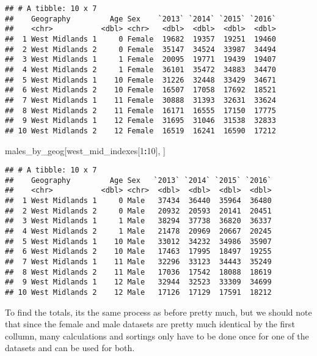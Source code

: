 \documentclass[]{article}
\newenvironment{Shaded}{\begin{snugshade}}{\end{snugshade}}
\newcommand{\DecValTok}[1]{\textcolor[rgb]{0.00,0.00,0.81}{#1}}
\newcommand{\OperatorTok}[1]{\textcolor[rgb]{0.81,0.36,0.00}{\textbf{#1}}}
\newcommand{\NormalTok}[1]{#1}
\begin{document}
\begin{verbatim}
## # A tibble: 10 x 7
##    Geography         Age Sex    `2013` `2014` `2015` `2016`
##    <chr>           <dbl> <chr>   <dbl>  <dbl>  <dbl>  <dbl>
##  1 West Midlands 1     0 Female  19682  19357  19251  19460
##  2 West Midlands 2     0 Female  35147  34524  33987  34494
##  3 West Midlands 1     1 Female  20095  19771  19439  19407
##  4 West Midlands 2     1 Female  36101  35472  34883  34470
##  5 West Midlands 1    10 Female  31226  32448  33429  34671
##  6 West Midlands 2    10 Female  16507  17058  17692  18521
##  7 West Midlands 1    11 Female  30888  31393  32631  33624
##  8 West Midlands 2    11 Female  16171  16555  17150  17775
##  9 West Midlands 1    12 Female  31695  31046  31538  32833
## 10 West Midlands 2    12 Female  16519  16241  16590  17212
\end{verbatim}

\begin{Shaded}
\begin{Highlighting}[]
\NormalTok{males_by_geog[west_mid_indexes[}\DecValTok{1}\OperatorTok{:}\DecValTok{10}\NormalTok{], ]}
\end{Highlighting}
\end{Shaded}

\begin{verbatim}
## # A tibble: 10 x 7
##    Geography         Age Sex   `2013` `2014` `2015` `2016`
##    <chr>           <dbl> <chr>  <dbl>  <dbl>  <dbl>  <dbl>
##  1 West Midlands 1     0 Male   37434  36440  35964  36480
##  2 West Midlands 2     0 Male   20932  20593  20141  20451
##  3 West Midlands 1     1 Male   38294  37738  36820  36337
##  4 West Midlands 2     1 Male   21478  20969  20667  20245
##  5 West Midlands 1    10 Male   33012  34232  34986  35907
##  6 West Midlands 2    10 Male   17463  17995  18497  19255
##  7 West Midlands 1    11 Male   32296  33123  34443  35249
##  8 West Midlands 2    11 Male   17036  17542  18088  18619
##  9 West Midlands 1    12 Male   32944  32523  33309  34699
## 10 West Midlands 2    12 Male   17126  17129  17591  18212
\end{verbatim}

To find the totals, its the same process as before pretty much, but we
should note that since the female and male datasets are pretty much
identical by the first collumn, many calculations and sortings only have
to be done once for one of the datasets and can be used for both.
\end{document}
